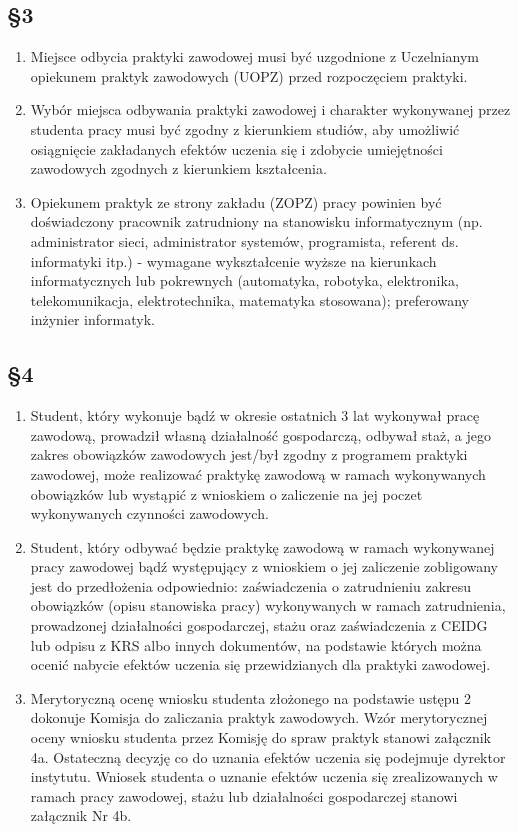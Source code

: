 \documentclass[12pt,a4paper]{article}
\begin{document}
\subsection*{\S 3}
\begin{enumerate}
    \item Miejsce odbycia praktyki zawodowej musi być uzgodnione z Uczelnianym opiekunem praktyk zawodowych (UOPZ) przed rozpoczęciem praktyki.
    \item Wybór miejsca odbywania praktyki zawodowej i charakter wykonywanej przez studenta pracy musi być zgodny z kierunkiem studiów, aby umożliwić osiągnięcie zakładanych efektów uczenia się i zdobycie umiejętności zawodowych zgodnych z kierunkiem kształcenia.
    \item Opiekunem praktyk ze strony zakładu (ZOPZ) pracy powinien być doświadczony pracownik zatrudniony na stanowisku informatycznym (np. administrator sieci, administrator systemów, programista, referent ds. informatyki itp.) - wymagane wykształcenie wyższe na kierunkach informatycznych lub pokrewnych (automatyka, robotyka, elektronika, telekomunikacja, elektrotechnika, matematyka stosowana); preferowany inżynier informatyk.
\end{enumerate}

\subsection*{\S 4}
\begin{enumerate}
    \item Student, który wykonuje bądź w okresie ostatnich 3 lat wykonywał pracę zawodową, prowadził własną działalność gospodarczą, odbywał staż, a jego zakres obowiązków zawodowych jest/był zgodny z programem praktyki zawodowej, może realizować praktykę zawodową w ramach wykonywanych obowiązków lub wystąpić z wnioskiem o zaliczenie na jej poczet wykonywanych czynności zawodowych.
    \item Student, który odbywać będzie praktykę zawodową w ramach wykonywanej pracy zawodowej bądź występujący z wnioskiem o jej zaliczenie zobligowany jest do przedłożenia odpowiednio: zaświadczenia o zatrudnieniu zakresu obowiązków (opisu stanowiska pracy) wykonywanych w ramach zatrudnienia, prowadzonej działalności gospodarczej, stażu oraz zaświadczenia z CEIDG lub odpisu z KRS albo innych dokumentów, na podstawie których można ocenić nabycie efektów uczenia się przewidzianych dla praktyki zawodowej.
    \item Merytoryczną ocenę wniosku studenta złożonego na podstawie ustępu 2 dokonuje Komisja do zaliczania praktyk zawodowych. Wzór merytorycznej oceny wniosku studenta przez Komisję do spraw praktyk stanowi załącznik 4a. Ostateczną decyzję co do uznania efektów uczenia się podejmuje dyrektor instytutu. Wniosek studenta o uznanie efektów uczenia się zrealizowanych w ramach pracy zawodowej, stażu lub działalności gospodarczej stanowi załącznik Nr 4b.
\end{enumerate}
\end{document}
